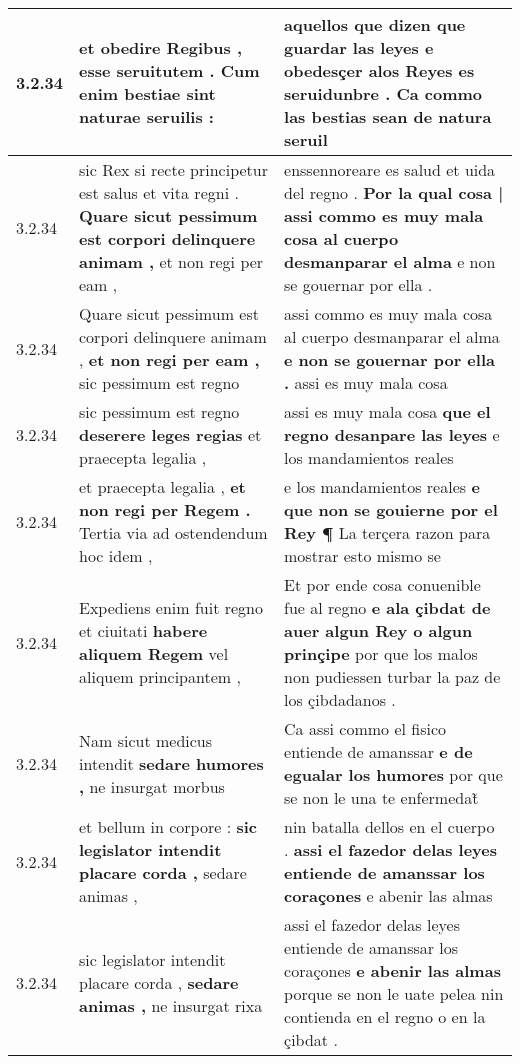 \begin{tabular}{|p{1cm}|p{6.5cm}|p{6.5cm}|}
3.2.34 & et obedire Regibus , \textbf{ esse seruitutem . } Cum enim bestiae sint naturae seruilis : & aquellos que dizen que guardar las leyes \textbf{ e obedesçer alos Reyes es seruidunbre . } Ca commo las bestias sean de natura seruil \\\hline
3.2.34 & sic Rex si recte principetur est salus et vita regni . \textbf{ Quare sicut pessimum est corpori delinquere animam , } et non regi per eam , & enssennoreare es salud et uida del regno . \textbf{ Por la qual cosa | assi commo es muy mala cosa al cuerpo desmanparar el alma } e non se gouernar por ella . \\\hline
3.2.34 & Quare sicut pessimum est corpori delinquere animam , \textbf{ et non regi per eam , } sic pessimum est regno & assi commo es muy mala cosa al cuerpo desmanparar el alma \textbf{ e non se gouernar por ella . } assi es muy mala cosa \\\hline
3.2.34 & sic pessimum est regno \textbf{ deserere leges regias } et praecepta legalia , & assi es muy mala cosa \textbf{ que el regno desanpare las leyes } e los mandamientos reales \\\hline
3.2.34 & et praecepta legalia , \textbf{ et non regi per Regem . } Tertia via ad ostendendum hoc idem , & e los mandamientos reales \textbf{ e que non se gouierne por el Rey ¶ } La terçera razon para mostrar esto mismo se \\\hline
3.2.34 & Expediens enim fuit regno et ciuitati \textbf{ habere aliquem Regem } vel aliquem principantem , & Et por ende cosa conuenible fue al regno \textbf{ e ala çibdat de auer algun Rey o algun prinçipe } por que los malos non pudiessen turbar la paz de los çibdadanos . \\\hline
3.2.34 & Nam sicut medicus intendit \textbf{ sedare humores , } ne insurgat morbus & Ca assi commo el fisico entiende de amanssar \textbf{ e de egualar los humores } por que se non le una te enfermedat̃ \\\hline
3.2.34 & et bellum in corpore : \textbf{ sic legislator intendit placare corda , } sedare animas , & nin batalla dellos en el cuerpo . \textbf{ assi el fazedor delas leyes entiende de amanssar los coraçones } e abenir las almas \\\hline
3.2.34 & sic legislator intendit placare corda , \textbf{ sedare animas , } ne insurgat rixa & assi el fazedor delas leyes entiende de amanssar los coraçones \textbf{ e abenir las almas } porque se non le uate pelea nin contienda en el regno o en la çibdat . \\\hline

\end{tabular}
